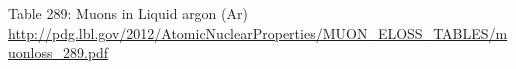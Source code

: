\begin{thebibliography}{1}

   Table 289: Muons in Liquid argon (Ar) \url{http://pdg.lbl.gov/2012/AtomicNuclearProperties/MUON_ELOSS_TABLES/muonloss_289.pdf}

  
  










\end{thebibliography}
